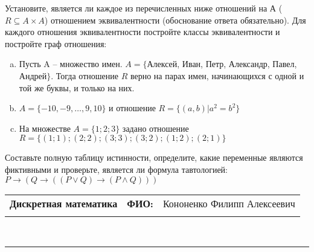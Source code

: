 \documentclass[10pt]{exam}
\newcommand{\class}{Дискретная математика}
\newcommand{\examdate}{}
\begin{document}
\begin{questions}
\question
Установите, является ли каждое из перечисленных ниже отношений на А ($R \subseteq A \times A$) отношением эквивалентности (обоснование ответа обязательно). Для каждого отношения эквивалентности постройте классы 
эквивалентности и постройте граф отношения:
\begin{enumerate} [a)]\setcounter{enumi}{0}
\item Пусть A – множество имен. $A = \{ $Алексей, Иван, Петр, Александр, Павел, Андрей$ \}$. Тогда отношение $R$ верно на парах имен, начинающихся с одной и той же буквы, и только на них.
\item $A = \{-10, -9, … , 9, 10\}$ и отношение $ R = \{(a,b)|a^{2} = b^{2}\}$
\item На множестве $A = \{1; 2; 3\}$ задано отношение $R = \{(1; 1); (2; 2); (3; 3); (3; 2); (1; 2); (2; 1)\}$
\end{enumerate}\question Составьте полную таблицу истинности, определите, какие переменные являются фиктивными и проверьте, является ли формула тавтологией:
$ P \rightarrow (Q \rightarrow ((P \lor Q) \rightarrow (P \land Q)))$

\end{questions}
\newpage
\begin{flushright}
\begin{tabular}{p{2.8in} r l}
\textbf{\class} & \textbf{ФИО:} &Кононенко Филипп Алексеевич
\\

\textbf{\examdate} &&\\
\end{tabular}\\
\end{flushright}
\rule[1ex]{\textwidth}{.1pt}
\end{document}
